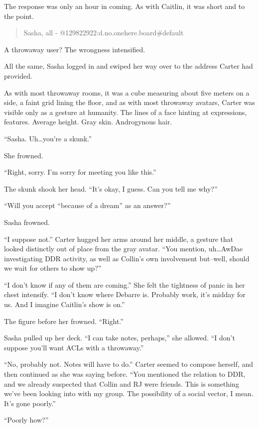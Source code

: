The response was only an hour in coming. As with Caitlin, it was short and to the point.

\begin{quote}
Sasha, all - @129822922:d.no.onehere.board\#default
\end{quote}

A throwaway user? The wrongness intensified.

All the same, Sasha logged in and swiped her way over to the address Carter had provided.

As with most throwaway rooms, it was a cube measuring about five meters on a side, a faint grid lining the floor, and as with most throwaway avatars, Carter was visible only as a gesture at humanity. The lines of a face hinting at expressions, features. Average height. Gray skin. Androgynous hair.

``Sasha. Uh\ldots{}you're a skunk.''

She frowned.

``Right, sorry. I'm sorry for meeting you like this.''

The skunk shook her head. ``It's okay, I guess. Can you tell me why?''

``Will you accept ``because of a dream'' as an answer?''

Sasha frowned.

``I suppose not.'' Carter hugged her arms around her middle, a gesture that looked distinctly out of place from the gray avatar. ``You mention, uh\ldots{}AwDae investigating DDR activity, as well as Collin's own involvement but--well, should we wait for others to show up?''

``I don't know if any of them are coming.'' She felt the tightness of panic in her chest intensify. ``I don't know where Debarre is. Probably work, it's midday for us. And I imagine Caitlin's show is on.''

The figure before her frowned. ``Right.''

Sasha pulled up her deck. ``I can take notes, perhaps,'' she allowed. ``I don't suppose you'll want ACLs with a throwaway.''

``No, probably not. Notes will have to do.'' Carter seemed to compose herself, and then continued as she was saying before. ``You mentioned the relation to DDR, and we already suspected that Collin and RJ were friends. This is something we've been looking into with my group. The possibility of a social vector, I mean. It's gone poorly.''

``Poorly how?''

